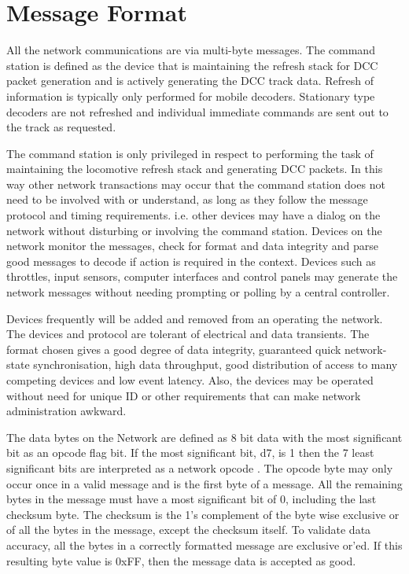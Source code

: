 \section{Message Format}

All the network communications are via multi-byte messages. The command station is defined as the device that is maintaining the refresh stack for DCC packet generation and is actively generating the DCC track data. Refresh of information is typically only performed for mobile decoders. Stationary type decoders are not refreshed and individual immediate commands are sent out to the track as requested.

The command station is only privileged in respect to performing the task of maintaining the locomotive refresh stack and generating DCC packets. In this way other network transactions may occur that the command station does not need to be involved with or understand, as long as they follow the message protocol and timing requirements. i.e. other devices may have a dialog on the network without disturbing or involving the command station. Devices on the network monitor the messages, check for format and data integrity and parse good messages to decode if action is required in the context. Devices such as throttles, input sensors, computer interfaces and control panels may generate the network messages without needing prompting or polling by a central controller.

Devices frequently will be added and removed from an operating the network. The devices and protocol are tolerant of electrical and data transients. The format chosen gives a good degree of data integrity, guaranteed quick network-state synchronisation, high data throughput, good distribution of access to many competing devices and low event latency. Also, the devices may be operated without need for unique ID or other requirements that can make network administration awkward.

The data bytes on the Network are defined as 8 bit data with the most significant bit as an opcode flag bit. If the most significant bit, d7, is 1 then the 7 least significant bits are interpreted as a network opcode . The opcode byte may only occur once in a valid message and is the first byte of a message. All the remaining bytes in the message must have a most significant bit of 0, including the last checksum byte. The checksum is the 1's complement of the byte wise exclusive or of all the bytes in the message, except the checksum itself. To validate data accuracy, all the bytes in a correctly formatted message are exclusive or'ed. If this resulting byte value is 0xFF, then the message data is accepted as good.

